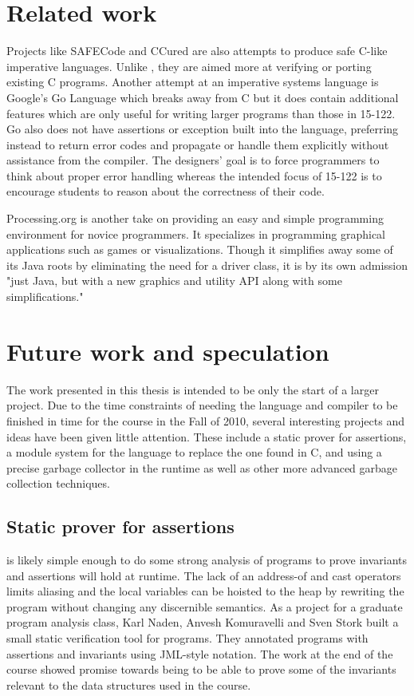 \section{Related work}
Projects like SAFECode \cite{SAFECode} and CCured \cite{Necula02ccured} are also
attempts to produce safe C-like imperative languages. Unlike \langname{}, they
are aimed more at verifying or porting existing C programs. Another attempt at
an imperative systems language is Google's Go Language \cite{GoLang} which
breaks away from C but it does contain additional features which are only useful
for writing larger programs than those in 15-122. Go also does not have
assertions or exception built into the language, preferring instead to return
error codes and propagate or handle them explicitly without assistance from the
compiler. The designers' goal is to force programmers to think about proper error
handling whereas the intended focus of 15-122 is to encourage students to reason
about the correctness of their code.

Processing.org \cite{Processing} is another take on providing an easy and simple
programming environment for novice programmers. It specializes in programming
graphical applications such as games or visualizations. Though it simplifies
away some of its Java roots by eliminating the need for a driver class, it is by
its own admission "just Java, but with a new graphics and utility API along with
some simplifications."

\section{Future work and speculation}
The work presented in this thesis is intended to be only the start of a larger
project. Due to the time constraints of needing the language and compiler to be
finished in time for the course in the Fall of 2010, several interesting
projects and ideas have been given little attention. These include a static
prover for assertions, a module system for the language to replace the one found
in C, and using a precise garbage collector in the runtime as well as other more
advanced garbage collection techniques.

\subsection{Static prover for assertions}
\langname{} is likely simple enough to do some strong analysis of programs to
prove invariants and assertions will hold at runtime. The lack of an address-of
and cast operators limits aliasing and the local variables can be hoisted to the
heap by rewriting the program without changing any discernible semantics. As a
project for a graduate program analysis class, Karl Naden, Anvesh Komuravelli
and Sven Stork built a small static verification tool for programs.  They
annotated programs with assertions and invariants using JML-style notation.
The work at the end of the course showed promise towards being to be able to
prove some of the invariants relevant to the data structures used in the course.

